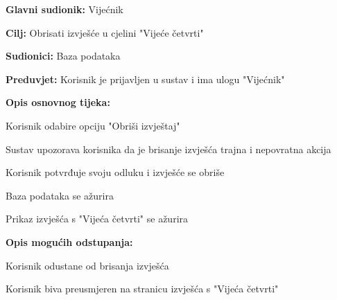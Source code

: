 						\noindent {}
					\begin{packed_item}
	
						\item \textbf{Glavni sudionik: }Vijećnik
						\item  \textbf{Cilj:} Obrisati izvješće u cjelini "Vijeće četvrti"
						\item  \textbf{Sudionici:} Baza podataka
						\item  \textbf{Preduvjet:} Korisnik je prijavljen u sustav i ima ulogu "Vijećnik"
						\item  \textbf{Opis osnovnog tijeka:}
						
						\item[] \begin{packed_enum}
	
							\item Korisnik odabire opciju "Obriši izvještaj"
							\item Sustav upozorava korisnika da je brisanje izvješća trajna i nepovratna akcija
							\item Korisnik potvrđuje svoju odluku i izvješće se obriše
							\item Baza podataka se ažurira
							\item Prikaz izvješća s "Vijeća četvrti" se ažurira
						\end{packed_enum}
						
						\item  \textbf{Opis mogućih odstupanja:}
						
						\item[] \begin{packed_item}
	
							\item[3.a] Korisnik odustane od brisanja izvješća
							\item[] \begin{packed_enum}
								
								\item Korisnik biva preusmjeren na stranicu izvješća s "Vijeća četvrti"
								
							\end{packed_enum}
							
						\end{packed_item}
					\end{packed_item}
						
						
						
